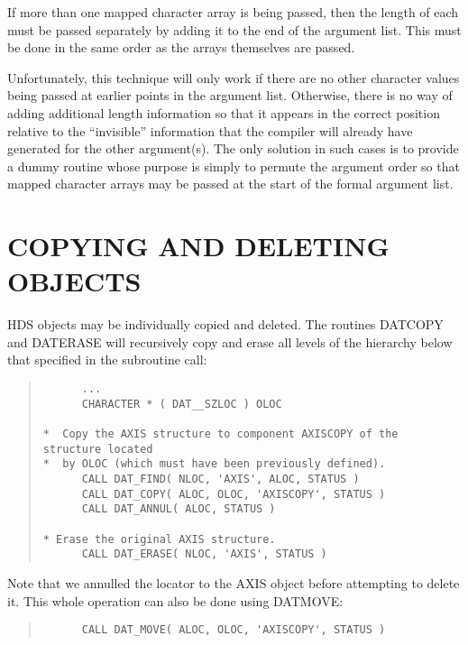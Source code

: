 \documentclass[twoside,11pt]{article}
\newcommand{\htmlref}[2]{#1}
\newcommand{\xlabel}[1]{}
\renewcommand{\_}{\texttt{\symbol{95}}}
\newcommand{\qt}[1]{``#1''}
\newcommand{\qt}[1]{{\tt{"}}#1{\tt{"}}}
\begin{document}
If more than one mapped character array is being passed, then the
length of each must be passed separately by adding it to the end of
the argument list.  This must be done in the same order as the arrays
themselves are passed.

Unfortunately, this technique will only work if there are no other
character values being passed at earlier points in the argument
list. Otherwise, there is no way of adding additional length
information so that it appears in the correct position relative to the
\qt{invisible} information that the compiler will already have
generated for the other argument(s). The only solution in such cases
is to provide a dummy routine whose purpose is simply to permute the
argument order so that mapped character arrays may be passed at the
start of the formal argument list.

\section{\xlabel{copying}\xlabel{deleting}COPYING AND DELETING OBJECTS}

HDS objects may be individually copied and deleted.  The routines
\htmlref{DAT\_COPY}{DAT_COPY} and \htmlref{DAT\_ERASE}{DAT_ERASE} will
recursively copy and erase all levels of the hierarchy below that
specified in the subroutine call:

\small
\begin{quote}
\begin{verbatim}
      ...
      CHARACTER * ( DAT__SZLOC ) OLOC

*  Copy the AXIS structure to component AXISCOPY of the structure located
*  by OLOC (which must have been previously defined).
      CALL DAT_FIND( NLOC, 'AXIS', ALOC, STATUS )
      CALL DAT_COPY( ALOC, OLOC, 'AXISCOPY', STATUS )
      CALL DAT_ANNUL( ALOC, STATUS )

* Erase the original AXIS structure.
      CALL DAT_ERASE( NLOC, 'AXIS', STATUS )
\end{verbatim}
\end{quote}
\normalsize

Note that we \htmlref{annulled}{sect:annul} the
\htmlref{locator}{sect:locators} to the AXIS object before attempting
to delete it. This whole operation can also be done using
\htmlref{DAT\_MOVE}{DAT_MOVE}:

\small
\begin{quote}
\begin{verbatim}
      CALL DAT_MOVE( ALOC, OLOC, 'AXISCOPY', STATUS )
\end{verbatim}
\end{quote}
\normalsize
\end{document}
